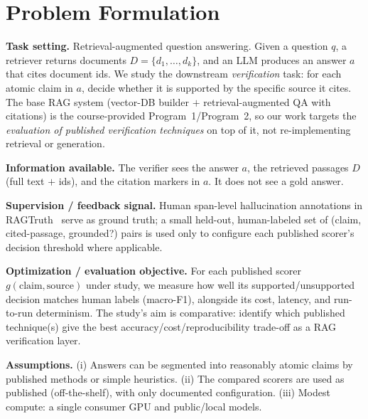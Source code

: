 \section{Problem Formulation}

\textbf{Task setting.} Retrieval-augmented question answering. Given a question $q$, a
retriever returns documents $D=\{d_1,\dots,d_k\}$, and an LLM produces an answer $a$ that
cites document ids. We study the downstream \emph{verification} task: for each atomic
claim in $a$, decide whether it is supported by the specific source it cites. The base RAG
system (vector-DB builder $+$ retrieval-augmented QA with citations) is the
course-provided Program~1/Program~2, so our work targets the \emph{evaluation of published
verification techniques} on top of it, not re-implementing retrieval or generation.

\textbf{Information available.} The verifier sees the answer $a$, the retrieved passages
$D$ (full text $+$ ids), and the citation markers in $a$. It does not see a gold answer.

\textbf{Supervision / feedback signal.} Human span-level hallucination annotations in
RAGTruth~\citep{niu2024ragtruth} serve as ground truth; a small held-out, human-labeled
set of (claim, cited-passage, grounded?) pairs is used only to configure each published
scorer's decision threshold where applicable.

\textbf{Optimization / evaluation objective.} For each published scorer
$g(\text{claim},\text{source})$ under study, we measure how well its supported/unsupported
decision matches human labels (macro-F1), alongside its cost, latency, and run-to-run
determinism. The study's aim is comparative: identify which published technique(s) give
the best accuracy/cost/reproducibility trade-off as a RAG verification layer.

\textbf{Assumptions.} (i) Answers can be segmented into reasonably atomic claims by
published methods or simple heuristics. (ii) The compared scorers are used as published
(off-the-shelf), with only documented configuration. (iii) Modest compute: a single
consumer GPU and public/local models.
